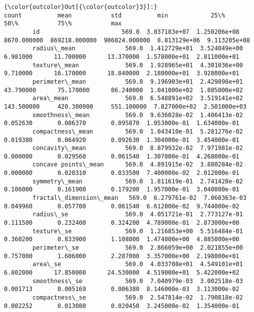 \documentclass[11pt]{article}
\begin{document}
\begin{Verbatim}[commandchars=\\\{\}]
{\color{outcolor}Out[{\color{outcolor}3}]:}                          count          mean           std          min            25\%            50\%           75\%           max
        id                       569.0  3.037183e+07  1.250206e+08  8670.000000  869218.000000  906024.000000  8.813129e+06  9.113205e+08
        radius\_mean              569.0  1.412729e+01  3.524049e+00     6.981000      11.700000      13.370000  1.578000e+01  2.811000e+01
        texture\_mean             569.0  1.928965e+01  4.301036e+00     9.710000      16.170000      18.840000  2.180000e+01  3.928000e+01
        perimeter\_mean           569.0  9.196903e+01  2.429898e+01    43.790000      75.170000      86.240000  1.041000e+02  1.885000e+02
        area\_mean                569.0  6.548891e+02  3.519141e+02   143.500000     420.300000     551.100000  7.827000e+02  2.501000e+03
        smoothness\_mean          569.0  9.636028e-02  1.406413e-02     0.052630       0.086370       0.095870  1.053000e-01  1.634000e-01
        compactness\_mean         569.0  1.043410e-01  5.281276e-02     0.019380       0.064920       0.092630  1.304000e-01  3.454000e-01
        concavity\_mean           569.0  8.879932e-02  7.971981e-02     0.000000       0.029560       0.061540  1.307000e-01  4.268000e-01
        concave points\_mean      569.0  4.891915e-02  3.880284e-02     0.000000       0.020310       0.033500  7.400000e-02  2.012000e-01
        symmetry\_mean            569.0  1.811619e-01  2.741428e-02     0.106000       0.161900       0.179200  1.957000e-01  3.040000e-01
        fractal\_dimension\_mean   569.0  6.279761e-02  7.060363e-03     0.049960       0.057700       0.061540  6.612000e-02  9.744000e-02
        radius\_se                569.0  4.051721e-01  2.773127e-01     0.111500       0.232400       0.324200  4.789000e-01  2.873000e+00
        texture\_se               569.0  1.216853e+00  5.516484e-01     0.360200       0.833900       1.108000  1.474000e+00  4.885000e+00
        perimeter\_se             569.0  2.866059e+00  2.021855e+00     0.757000       1.606000       2.287000  3.357000e+00  2.198000e+01
        area\_se                  569.0  4.033708e+01  4.549101e+01     6.802000      17.850000      24.530000  4.519000e+01  5.422000e+02
        smoothness\_se            569.0  7.040979e-03  3.002518e-03     0.001713       0.005169       0.006380  8.146000e-03  3.113000e-02
        compactness\_se           569.0  2.547814e-02  1.790818e-02     0.002252       0.013080       0.020450  3.245000e-02  1.354000e-01

\end{Verbatim}
\end{document}
